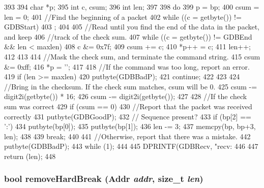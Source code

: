 \begin{DoxyCode}
393 {
394     char *p;
395     int c, csum;
396     int len;
397 
398     do {
399         p = bp;
400         csum = len = 0;
401         //Find the beginning of a packet
402         while ((c = getbyte()) != GDBStart)
403             ;
404 
405         //Read until you find the end of the data in the packet, and keep
406         //track of the check sum.
407         while ((c = getbyte()) != GDBEnd && len < maxlen) {
408             c &= 0x7f;
409             csum += c;
410             *p++ = c;
411             len++;
412         }
413 
414         //Mask the check sum, and terminate the command string.
415         csum &= 0xff;
416         *p = '\0';
417 
418         //If the command was too long, report an error.
419         if (len >= maxlen) {
420             putbyte(GDBBadP);
421             continue;
422         }
423 
424         //Bring in the checksum. If the check sum matches, csum will be 0.
425         csum -= digit2i(getbyte()) * 16;
426         csum -= digit2i(getbyte());
427 
428         //If the check sum was correct
429         if (csum == 0) {
430             //Report that the packet was received correctly
431             putbyte(GDBGoodP);
432             // Sequence present?
433             if (bp[2] == ':') {
434                 putbyte(bp[0]);
435                 putbyte(bp[1]);
436                 len -= 3;
437                 memcpy(bp, bp+3, len);
438             }
439             break;
440         }
441         //Otherwise, report that there was a mistake.
442         putbyte(GDBBadP);
443     } while (1);
444 
445     DPRINTF(GDBRecv, "recv:  %
446 
447     return (len);
448 }
\end{DoxyCode}
\hypertarget{classBaseRemoteGDB_a4c7eed355fe612b660050cbea42fb722}{
\subsubsection[{removeHardBreak}]{\setlength{\rightskip}{0pt plus 5cm}bool removeHardBreak ({\bf Addr} {\em addr}, \/  size\_\-t {\em len})}}
\label{classBaseRemoteGDB_a4c7eed355fe612b660050cbea42fb722}



